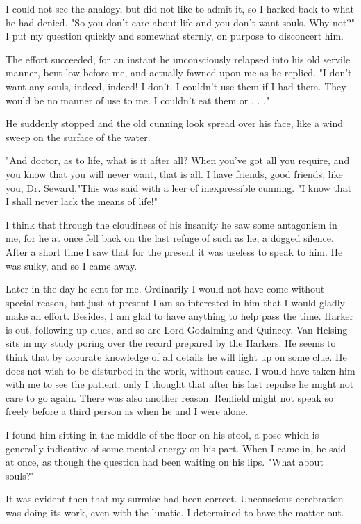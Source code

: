 I could not see the analogy, but did not like to admit it, so I harked back to what he had denied. "So you don't care about life and you don't want souls. Why not?" I put my question quickly and somewhat sternly, on purpose to disconcert him. 

The effort succeeded, for an instant he unconsciously relapsed into his old servile manner, bent low before me, and actually fawned upon me as he replied. "I don't want any souls, indeed, indeed! I don't. I couldn't use them if I had them. They would be no manner of use to me. I couldn't eat them or . . ." 

He suddenly stopped and the old cunning look spread over his face, like a wind sweep on the surface of the water. 

"And doctor, as to life, what is it after all? When you've got all you require, and you know that you will never want, that is all. I have friends, good friends, like you, Dr. Seward."This was said with a leer of inexpressible cunning. "I know that I shall never lack the means of life!" 

I think that through the cloudiness of his insanity he saw some antagonism in me, for he at once fell back on the last refuge of such as he, a dogged silence. After a short time I saw that for the present it was useless to speak to him. He was sulky, and so I came away. 

Later in the day he sent for me. Ordinarily I would not have come without special reason, but just at present I am so interested in him that I would gladly make an effort. Besides, I am glad to have anything to help pass the time. Harker is out, following up clues, and so are Lord Godalming and Quincey. Van Helsing sits in my study poring over the record prepared by the Harkers. He seems to think that by accurate knowledge of all details he will light up on some clue. He does not wish to be disturbed in the work, without cause. I would have taken him with me to see the patient, only I thought that after his last repulse he might not care to go again. There was also another reason. Renfield might not speak so freely before a third person as when he and I were alone. 

I found him sitting in the middle of the floor on his stool, a pose which is generally indicative of some mental energy on his part. When I came in, he said at once, as though the question had been waiting on his lips. "What about souls?" 

It was evident then that my surmise had been correct. Unconscious cerebration was doing its work, even with the lunatic. I determined to have the matter out. 

